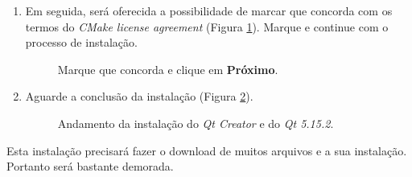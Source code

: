 \documentclass[a4paper,11pt]{article}
\newcommand{\qtcreator}{\textit{Qt Creator}}
\newcommand{\qtfive}{\textit{Qt 5.15.2}}
\begin{document}
\begin{enumerate}
\item Em seguida, será oferecida a possibilidade de marcar que concorda com os termos do \textit{CMake license agreement} (Figura \ref{fig:qt_mark_read}). Marque e continue com o processo de instalação.

\begin{figure}[H]
	\centering
	\caption{ Marque que concorda e clique em \textbf{Próximo}.}
	\label{fig:qt_mark_read}
\end{figure}

\item Aguarde a conclusão da instalação (Figura \ref{fig:qt_wait_inst_finish}).

\begin{figure}[H]
	\centering
	\caption{Andamento da instalação do \qtcreator{} e do \qtfive{}.}
	\label{fig:qt_wait_inst_finish}
\end{figure}

\end{enumerate}

Esta instalação precisará fazer o download de muitos arquivos e a sua instalação. Portanto será bastante demorada.
\end{document}
